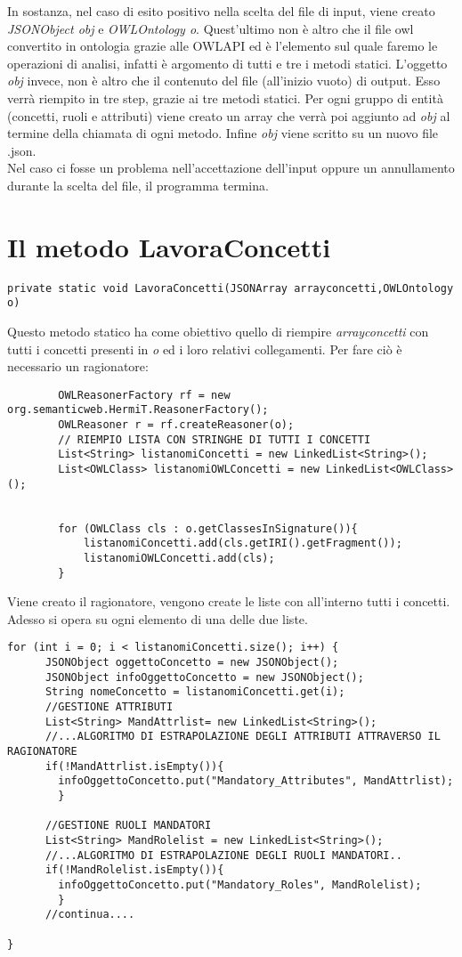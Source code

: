 \documentclass[Lau,binding=0.6cm]{sapthesis}
\begin{document}
In sostanza, nel caso di esito positivo nella scelta del file di input, viene creato \textit{JSONObject obj} e \textit{OWLOntology o}. Quest'ultimo non è altro che il file owl convertito in ontologia grazie alle OWLAPI ed è l'elemento sul quale faremo le operazioni di analisi, infatti è argomento di tutti e tre i metodi statici. L'oggetto \textit{obj} invece, non è altro che il contenuto del file (all'inizio vuoto) di output. Esso verrà riempito in tre step, grazie ai tre metodi statici. Per ogni gruppo di entità (concetti, ruoli e attributi) viene creato un array che verrà poi aggiunto ad \textit{obj} al termine della chiamata di ogni metodo. Infine \textit{obj} viene scritto su un nuovo file .json.
\\Nel caso ci fosse un problema nell'accettazione dell'input oppure un annullamento durante la scelta del file, il programma termina.

\section{Il metodo LavoraConcetti}
\begin{verbatim}
private static void LavoraConcetti(JSONArray arrayconcetti,OWLOntology o) 
\end{verbatim}
Questo metodo statico ha come obiettivo quello di riempire \textit{arrayconcetti} con tutti i concetti presenti in \textit{o} ed i loro relativi collegamenti.
Per fare ciò è necessario un ragionatore:
\begin{verbatim}
		OWLReasonerFactory rf = new org.semanticweb.HermiT.ReasonerFactory();
		OWLReasoner r = rf.createReasoner(o);
		// RIEMPIO LISTA CON STRINGHE DI TUTTI I CONCETTI       
		List<String> listanomiConcetti = new LinkedList<String>();
		List<OWLClass> listanomiOWLConcetti = new LinkedList<OWLClass>();
		
		
		for (OWLClass cls : o.getClassesInSignature()){
	     	listanomiConcetti.add(cls.getIRI().getFragment());
    	 	listanomiOWLConcetti.add(cls);                       
		}
\end{verbatim}
Viene creato il ragionatore, vengono create le liste con all'interno tutti i concetti. Adesso si opera su ogni elemento di una delle due liste.
\begin{verbatim}
for (int i = 0; i < listanomiConcetti.size(); i++) {
      JSONObject oggettoConcetto = new JSONObject();
      JSONObject infoOggettoConcetto = new JSONObject();
      String nomeConcetto = listanomiConcetti.get(i);
      //GESTIONE ATTRIBUTI
      List<String> MandAttrlist= new LinkedList<String>(); 
      //...ALGORITMO DI ESTRAPOLAZIONE DEGLI ATTRIBUTI ATTRAVERSO IL RAGIONATORE
      if(!MandAttrlist.isEmpty()){
      	infoOggettoConcetto.put("Mandatory_Attributes", MandAttrlist);
      	}
      
      //GESTIONE RUOLI MANDATORI
      List<String> MandRolelist = new LinkedList<String>();
      //...ALGORITMO DI ESTRAPOLAZIONE DEGLI RUOLI MANDATORI..
      if(!MandRolelist.isEmpty()){
      	infoOggettoConcetto.put("Mandatory_Roles", MandRolelist);
      	}
      //continua....	
      
}
\end{verbatim}
\end{document}
